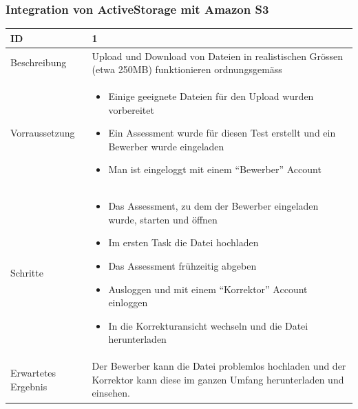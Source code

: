 \subsubsection{Integration von ActiveStorage mit Amazon S3}
\begin{tabularx}{\textwidth}[H]{|s|X|}
    \hline
    ID                  & 1 \\
    \hline

    Beschreibung        &
    Upload und Download von Dateien in realistischen Grössen (etwa 250MB) funktionieren ordnungsgemäss
    \\ \hline

    Vorraussetzung      &
    \begin{itemize}
        \item Einige geeignete Dateien für den Upload wurden vorbereitet
        \item Ein Assessment wurde für diesen Test erstellt und ein Bewerber wurde eingeladen
        \item Man ist eingeloggt mit einem \enquote{Bewerber} Account
    \end{itemize}
    \\ \hline

    Schritte            &
    \begin{itemize}
        \item Das Assessment, zu dem der Bewerber eingeladen wurde, starten und öffnen
        \item Im ersten Task die Datei hochladen
        \item Das Assessment frühzeitig abgeben
        \item Ausloggen und mit einem \enquote{Korrektor} Account einloggen
        \item In die Korrekturansicht wechseln und die Datei herunterladen
    \end{itemize}
    \\ \hline

    Erwartetes Ergebnis &
    Der Bewerber kann die Datei problemlos hochladen und der Korrektor kann diese im ganzen Umfang herunterladen und einsehen.
    \\ \hline
\end{tabularx}

